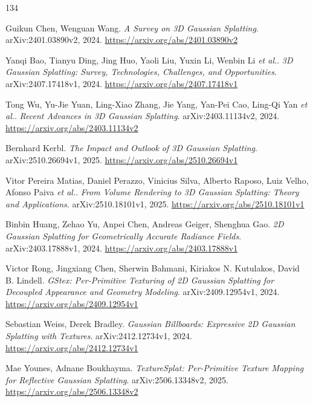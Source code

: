\documentclass[11pt,a4paper]{article}
\begin{document}
\begin{thebibliography}{134}
\setlength{\itemsep}{2pt}

Guikun Chen, Wenguan Wang.
\newblock \emph{A Survey on 3D Gaussian Splatting}.
\newblock arXiv:2401.03890v2, 2024.
\newblock \url{https://arxiv.org/abs/2401.03890v2}

Yanqi Bao, Tianyu Ding, Jing Huo, Yaoli Liu, Yuxin Li, Wenbin Li \emph{et al.}.
\newblock \emph{3D Gaussian Splatting: Survey, Technologies, Challenges, and Opportunities}.
\newblock arXiv:2407.17418v1, 2024.
\newblock \url{https://arxiv.org/abs/2407.17418v1}

Tong Wu, Yu-Jie Yuan, Ling-Xiao Zhang, Jie Yang, Yan-Pei Cao, Ling-Qi Yan \emph{et al.}.
\newblock \emph{Recent Advances in 3D Gaussian Splatting}.
\newblock arXiv:2403.11134v2, 2024.
\newblock \url{https://arxiv.org/abs/2403.11134v2}

Bernhard Kerbl.
\newblock \emph{The Impact and Outlook of 3D Gaussian Splatting}.
\newblock arXiv:2510.26694v1, 2025.
\newblock \url{https://arxiv.org/abs/2510.26694v1}

Vitor Pereira Matias, Daniel Perazzo, Vinicius Silva, Alberto Raposo, Luiz Velho, Afonso Paiva \emph{et al.}.
\newblock \emph{From Volume Rendering to 3D Gaussian Splatting: Theory and Applications}.
\newblock arXiv:2510.18101v1, 2025.
\newblock \url{https://arxiv.org/abs/2510.18101v1}

Binbin Huang, Zehao Yu, Anpei Chen, Andreas Geiger, Shenghua Gao.
\newblock \emph{2D Gaussian Splatting for Geometrically Accurate Radiance Fields}.
\newblock arXiv:2403.17888v1, 2024.
\newblock \url{https://arxiv.org/abs/2403.17888v1}

Victor Rong, Jingxiang Chen, Sherwin Bahmani, Kiriakos N. Kutulakos, David B. Lindell.
\newblock \emph{GStex: Per-Primitive Texturing of 2D Gaussian Splatting for Decoupled Appearance and Geometry Modeling}.
\newblock arXiv:2409.12954v1, 2024.
\newblock \url{https://arxiv.org/abs/2409.12954v1}

Sebastian Weiss, Derek Bradley.
\newblock \emph{Gaussian Billboards: Expressive 2D Gaussian Splatting with Textures}.
\newblock arXiv:2412.12734v1, 2024.
\newblock \url{https://arxiv.org/abs/2412.12734v1}

Mae Younes, Adnane Boukhayma.
\newblock \emph{TextureSplat: Per-Primitive Texture Mapping for Reflective Gaussian Splatting}.
\newblock arXiv:2506.13348v2, 2025.
\newblock \url{https://arxiv.org/abs/2506.13348v2}


\end{thebibliography}
\end{document}
